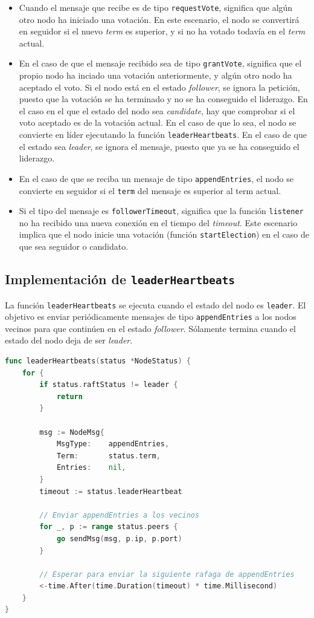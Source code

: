 \begin{itemize}
\item Cuando el mensaje que recibe es de tipo \texttt{requestVote}, significa que algún otro nodo ha iniciado una votación. En este escenario, el nodo se convertirá en seguidor si el nuevo \textit{term} es superior, y si no ha votado todavía en el \textit{term} actual.

\item En el caso de que el mensaje recibido sea de tipo \texttt{grantVote}, significa que el propio nodo ha inciado una votación anteriormente, y algún otro nodo ha aceptado el voto. Si el nodo está en el estado \textit{follower}, se ignora la petición, puesto que la votación se ha terminado y no se ha conseguido el liderazgo. En el caso en el que el estado del nodo sea \textit{candidate}, hay que comprobar si el voto aceptado es de la votación actual. En el caso de que lo sea, el nodo se convierte en líder ejecutando la función \texttt{leaderHeartbeats}. En el caso de que el estado sea \textit{leader}, se ignora el mensaje, puesto que ya se ha conseguido el liderazgo.

\item En el caso de que se reciba un mensaje de tipo \texttt{appendEntries}, el nodo se convierte en seguidor si el \texttt{term} del mensaje es superior al term actual.

\item Si el tipo del mensaje es \texttt{followerTimeout}, significa que la función \texttt{listener} no ha recibido una nueva conexión en el tiempo del \textit{timeout}. Este escenario implica que el nodo inicie una votación (función \texttt{startElection}) en el caso de que sea seguidor o candidato.
\end{itemize}

\subsection{Implementación de \texttt{leaderHeartbeats}}

La función \texttt{leaderHeartbeats} se ejecuta cuando el estado del nodo es \texttt{leader}. El objetivo es enviar periódicamente mensajes de tipo \texttt{appendEntries} a los nodos vecinos para que continúen en el estado \textit{follower}. Sólamente termina cuando el estado del nodo deja de ser \textit{leader}. 

\begin{lstlisting}[language=go]
func leaderHeartbeats(status *NodeStatus) {
	for {
		if status.raftStatus != leader {
			return
		}

		msg := NodeMsg{
			MsgType:    appendEntries,
			Term:       status.term,
			Entries:    nil,
		}
		timeout := status.leaderHeartbeat
		
		// Enviar appendEntries a los vecinos
		for _, p := range status.peers {
			go sendMsg(msg, p.ip, p.port)
		}

		// Esperar para enviar la siguiente rafaga de appendEntries
		<-time.After(time.Duration(timeout) * time.Millisecond)
	}
}
\end{lstlisting}

